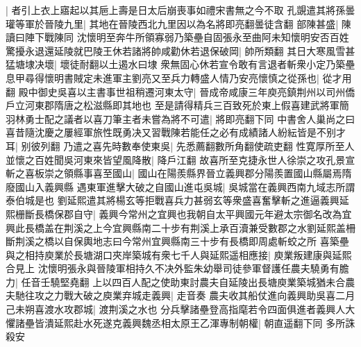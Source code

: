 |{
	者引上衣上寤起以其巵上壽是日太后崩喪事如禮宋書無之今不取}
孔覬遣其將孫曇瓘等軍於晉陵九里|{
	其地在晉陵西北九里因以為名將即亮翻曇徒含翻}
部陳甚盛|{
	陳讀曰陣下戰陳同}
沈懷明至奔牛所領寡弱乃築壘自固張永至曲阿未知懷明安否百姓驚擾永退還延陵就巴陵王休若諸將帥咸勸休若退保破岡|{
	帥所類翻}
其日大寒風雪甚猛塘埭决壞|{
	壞徒耐翻以土遏水曰埭}
衆無固心休若宣令敢有言退者斬衆小定乃築壘息甲尋得懷明書賊定未進軍主劉亮又至兵力轉盛人情乃安亮懷慎之從孫也|{
	從才用翻}
殿中御史吳喜以主書事世祖稍遷河東太守|{
	晉成帝咸康三年庾亮鎮荆州以司州僑戶立河東郡隋唐之松滋縣即其地也}
至是請得精兵三百致死於東上假喜建武將軍簡羽林勇士配之議者以喜刀筆主者未嘗為將不可遣|{
	將即亮翻下同}
中書舍人巢尚之曰喜昔隨沈慶之屢經軍旅性既勇决又習戰陳若能任之必有成績諸人紛紜皆是不别才耳|{
	别彼列翻}
乃遣之喜先時數奉使東吳|{
	先悉薦翻數所角翻使疏吏翻}
性寛厚所至人並懷之百姓聞吳河東來皆望風降散|{
	降戶江翻}
故喜所至克捷永世人徐崇之攻孔景宣斬之喜板崇之領縣事喜至國山|{
	國山在陽羨縣界晉立義興郡分陽羨置國山縣屬焉隋廢國山入義興縣}
遇東軍進擊大破之自國山進屯吳城|{
	吳城當在義興西南九域志所謂泰伯城是也}
劉延熙遣其將楊玄等拒戰喜兵力甚弱玄等衆盛喜奮擊斬之進逼義興延熙栅斷長橋保郡自守|{
	義興今常州之宜興也我朝自太平興國元年避太宗御名改為宜興此長橋盖在荆溪之上今宜興縣南二十步有荆溪上承百瀆兼受數郡之水劉延熙盖柵斷荆溪之橋以自保輿地志曰今常州宜興縣南三十步有長橋即周處斬蛟之所}
喜築壘與之相持庾業於長塘湖口夾岸築城有衆七千人與延熙遥相應接|{
	庾業叛建康與延熙合見上}
沈懷明張永與晉陵軍相持久不决外監朱幼舉司徒參軍督護任農夫驍勇有膽力|{
	任音壬驍堅堯翻}
上以四百人配之使助東討農夫自延陵出長塘庾業築城猶未合農夫馳往攻之力戰大破之庾業弃城走義興|{
	走音奏}
農夫收其船仗進向義興助吳喜二月己未朔喜渡水攻郡城|{
	渡荆溪之水也}
分兵擊諸壘登高指麾若令四面俱進者義興人大懼諸壘皆潰延熙赴水死遂克義興魏丞相太原王乙渾專制朝權|{
	朝直遥翻下同}
多所誅殺安


